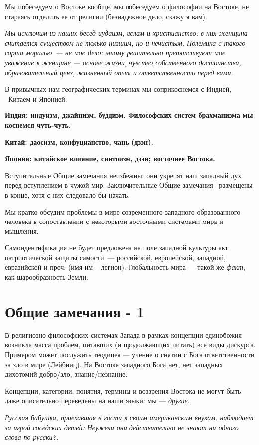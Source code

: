 Мы побеседуем о Востоке вообще, мы побеседуем о философии на Востоке, не стараясь отделить ее от религии (безнадежное дело, скажу я вам).


\textit{Мы исключим из наших бесед иудаизм, ислам и христианство: в них женщина считается существом не только низшим, но и
нечистым. Полемика с такого сорта \flqq моралью\frqq\ — не мое дело: этому решительно препятствуют мое уважение к женщине — основе жизни, чувство собственного достоинства, образовательный ценз, жизненный опыт и ответственность перед вами.}

В привычных нам географических терминах мы соприкоснемся с Индией, \ Китаем и Японией.

\textbf{Индия: индуизм, джайнизм, буддизм. Философских систем \textbf{брахманизма} мы коснемся чуть-чуть.}

{\bfseries
Китай: даосизм, конфуцианство, чань (дзэн).}

{\bfseries
Япония: китайское влияние, синтоизм, дзэн; восточнее Востока.}


\bigskip

Вступительные Общие замечания неизбежны: они укрепят наш западный дух перед вступлением в чужой мир. Заключительные
Общие замечания \ размещены в конце, хотя с них следовало бы начать.

Мы кратко обсудим проблемы в мире современного западного образованного человека в сопоставлении с некоторыми восточными
системами мира и мышления.

Самоидентификация не будет предложена на поле западной культуры акт патриотической защиты \flqq самости\frqq\ — российской,
европейской, западной, евразийской и проч. (\flqq имя им – легион\frqq). Глобальность мира — такой же \textit{факт}, как
шарообразность Земли.

\section{Общие замечания - 1}
В религиозно-философских системах Запада в рамках концепции единобожия возникла масса проблем, питавших (и продолжающих
питать) все виды дискурса. Примером может послужить теодицея — учение о снятии с Бога ответственности за зло в мире
(Лейбниц). На Востоке западного Бога нет, нет западных дихотомий добро/зло, знание/незнание.

Концепции, категории, понятия, термины и воззрения Востока не могут быть даже описательно переведены на наши языки: мы —
\textit{другие}.

\textit{Русская бабушка, приехавшая в гости к своим американским внукам, наблюдает за игрой соседских детей: \flqq Неужели они
действительно не знают ни одного слова по-русски?\frqq.}

